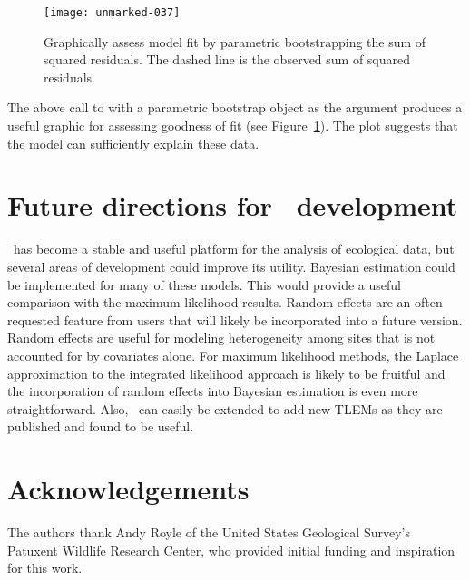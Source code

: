 \documentclass[article,shortnames]{jss}
\newcommand{\um}{\pkg{unmarked}}
\begin{document}
\begin{figure}[ht]
  \centering
\texttt{[image: unmarked-037]}
\caption{Graphically assess model fit by parametric bootstrapping
  the sum of squared residuals.  The dashed line is the observed sum
  of squared residuals.}
\label{fig:pb}
\end{figure}


The above call to  with a parametric bootstrap object as
the argument produces a useful graphic for assessing goodness of fit
(see Figure~\ref{fig:pb}).  The plot suggests that the model can sufficiently
explain these data.


\section[Future directions for unmarked development]{Future directions for \um\ development}
\label{sec:future-direct-unmark}

\um\ has become a stable and useful platform for the analysis of
ecological data, but several areas of development could improve its
utility.  Bayesian estimation could be implemented for many of these
models.  This would provide a useful comparison with the maximum
likelihood results.  Random effects are an often requested feature
from users that will likely be incorporated into a future version.
Random effects are useful for modeling heterogeneity among sites that
is not accounted for by covariates alone.  For maximum likelihood
methods, the Laplace approximation to the integrated likelihood
approach is likely to be fruitful and the incorporation of random
effects into Bayesian estimation is even more straightforward.  Also,
\um\ can easily be extended to add new TLEMs as they are published
and found to be useful.

\section*{Acknowledgements}

The authors thank Andy Royle of the United States Geological Survey's
Patuxent Wildlife Research Center, who provided initial funding and
inspiration for this work.

%

\end{document}
